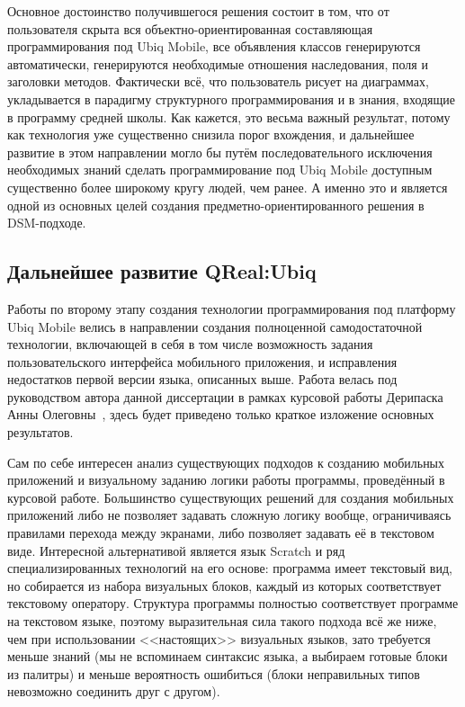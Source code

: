 Основное достоинство получившегося решения состоит в том, что от пользователя скрыта 
вся объектно-ориентированная составляющая программирования под Ubiq Mobile, все объявления 
классов генерируются автоматически, генерируются необходимые отношения наследования, 
поля и заголовки методов. Фактически всё, что пользователь рисует на диаграммах, укладывается 
в парадигму структурного программирования и в знания, входящие в программу средней 
школы. Как кажется, это весьма важный результат, потому как технология уже существенно 
снизила порог вхождения, и дальнейшее развитие в этом направлении могло бы путём последовательного 
исключения необходимых знаний сделать программирование под Ubiq Mobile доступным существенно 
более широкому кругу людей, чем ранее. А именно это и является одной из основных целей 
создания предметно-ориентированного решения в \ac{DSM}-подходе.

\subsection{Дальнейшее развитие QReal:Ubiq}
\label{chapter:advancedQRealUbiq}
Работы по второму этапу создания технологии программирования под платформу Ubiq Mobile 
велись в направлении создания полноценной самодостаточной технологии, включающей в себя 
в том числе возможность задания пользовательского интерфейса мобильного приложения, 
и исправления недостатков первой версии языка, описанных выше. Работа велась под руководством 
автора данной диссертации в рамках курсовой работы Дерипаска Анны Олеговны~\cite{deripaska2013course}, 
здесь будет приведено только краткое изложение основных результатов.

Сам по себе интересен анализ существующих подходов к созданию мобильных приложений 
и визуальному заданию логики работы программы, проведённый в курсовой работе. Большинство 
существующих решений для создания мобильных приложений либо не позволяет задавать 
сложную логику вообще, ограничиваясь правилами перехода между экранами, либо позволяет 
задавать её в текстовом виде. Интересной альтернативой является язык Scratch и ряд 
специализированных технологий на его основе: программа имеет текстовый вид, но собирается 
из набора визуальных блоков, каждый из которых соответствует текстовому оператору. 
Структура программы полностью соответствует программе на текстовом языке, поэтому 
выразительная сила такого подхода всё же ниже, чем при использовании <<настоящих>> 
визуальных языков, зато требуется меньше знаний (мы не вспоминаем синтаксис языка, 
а выбираем готовые блоки из палитры) и меньше вероятность ошибиться (блоки неправильных 
типов невозможно соединить друг с другом).

